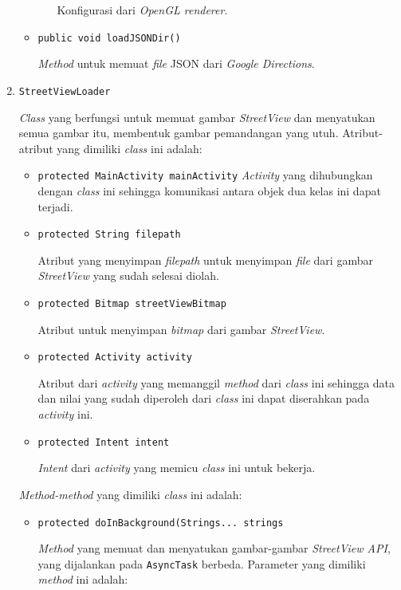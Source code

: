 \begin{enumerate}
\begin{itemize}
\begin{itemize}
			Konfigurasi dari  \textit{OpenGL renderer}. 				
			\end{itemize}
			
		\item \texttt{public void loadJSONDir()}
				
				\textit{Method} untuk  memuat \textit{file} JSON dari \textit{Google Directions}.
		\end{itemize}
	
	\item \texttt{StreetViewLoader}
	
	\textit{Class} yang berfungsi untuk memuat gambar \textit{StreetView} dan menyatukan semua gambar itu, membentuk gambar pemandangan yang utuh. Atribut-atribut yang dimiliki \textit{class} ini adalah:
	
	\begin{itemize}
		\item \texttt{protected MainActivity mainActivity}
		\textit{Activity} yang dihubungkan dengan \textit{class} ini  sehingga komunikasi antara objek dua kelas ini dapat terjadi. 		
		
		\item \texttt{protected String filepath}
		
		Atribut yang menyimpan \textit{filepath} untuk menyimpan \textit{file} dari gambar \textit{StreetView} yang sudah selesai diolah.
		\item \texttt{protected Bitmap streetViewBitmap}
		
		Atribut untuk menyimpan \textit{bitmap} dari gambar \textit{StreetView}.
		\item \texttt{protected Activity activity}
		
		Atribut dari \textit{activity} yang memanggil \textit{method} dari \textit{class} ini sehingga data dan nilai yang sudah diperoleh dari \textit{class} ini dapat diserahkan pada \textit{activity} ini.
		\item \texttt{protected Intent intent}  
		
		\textit{Intent} dari \textit{activity} yang memicu \textit{class} ini untuk bekerja.
	\end{itemize}
	
	\textit{Method-method} yang dimiliki \textit{class} ini adalah:
	
	\begin{itemize}
		\item \texttt{protected doInBackground(Strings... strings}
		
		\textit{Method} yang memuat dan menyatukan gambar-gambar \textit{StreetView API}, yang dijalankan pada \texttt{AsyncTask} berbeda. Parameter yang dimiliki \textit{method} ini adalah:
		

\end{itemize}
\end{enumerate}
